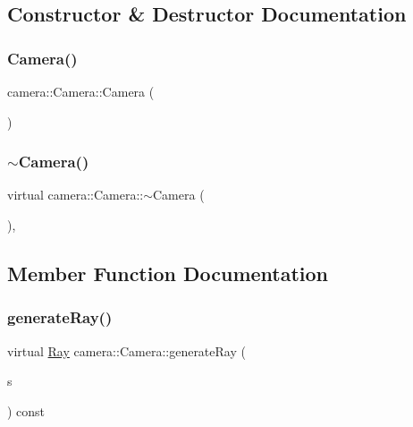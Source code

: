 \subsection{Constructor \& Destructor Documentation}
\mbox{\label{classcamera_1_1Camera_acb85cee9b6ea6dfe86143e7446aca6bf}} 
\subsubsection{\texorpdfstring{Camera()}{Camera()}}
{\footnotesize\ttfamily camera\+::\+Camera\+::\+Camera (\begin{DoxyParamCaption}{ }\end{DoxyParamCaption})\hspace{0.3cm}{\ttfamily [inline]}}

\mbox{\label{classcamera_1_1Camera_a51ce7c4d6738de1b4ae3362d9c8acd8e}} 
\subsubsection{\texorpdfstring{$\sim$Camera()}{~Camera()}}
{\footnotesize\ttfamily virtual camera\+::\+Camera\+::$\sim$\+Camera (\begin{DoxyParamCaption}{ }\end{DoxyParamCaption})\hspace{0.3cm}{\ttfamily [inline]}, {\ttfamily [virtual]}}



\subsection{Member Function Documentation}
\mbox{\label{classcamera_1_1Camera_ac8029a1623243615089d0847cdf49585}} 
\subsubsection{\texorpdfstring{generateRay()}{generateRay()}}
{\footnotesize\ttfamily virtual \mbox{\hyperlink{classRay}{Ray}} camera\+::\+Camera\+::generate\+Ray (\begin{DoxyParamCaption}\item[{const \mbox{\hyperlink{structcamera_1_1CameraSample}{Camera\+Sample}} \&}]{s }\end{DoxyParamCaption}) const\hspace{0.3cm}{\ttfamily [pure virtual]}}




